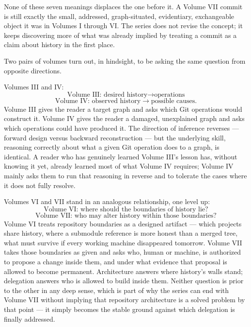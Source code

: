 \documentclass[11pt]{book}
\newcommand{\subheading}[1]{\bigskip\noindent{\bfseries\itshape #1}\smallskip\par}
\begin{document}
None of these seven meanings displaces the one before it. A Volume VII commit is still exactly the small, addressed, graph-situated, evidentiary, exchangeable object it was in Volumes I through VI. The series does not revise the concept; it keeps discovering more of what was already implied by treating a commit as a claim about history in the first place.

\subheading{Two Symmetries}

Two pairs of volumes turn out, in hindsight, to be asking the same question from opposite directions.

Volumes III and IV:
\[
\text{Volume III: desired history} \longrightarrow \text{operations}
\]
\[
\text{Volume IV: observed history} \longrightarrow \text{possible causes}.
\]
Volume III gives the reader a target graph and asks which Git operations would construct it. Volume IV gives the reader a damaged, unexplained graph and asks which operations could have produced it. The direction of inference reverses --- forward design versus backward reconstruction --- but the underlying skill, reasoning correctly about what a given Git operation does to a graph, is identical. A reader who has genuinely learned Volume III's lesson has, without knowing it yet, already learned most of what Volume IV requires; Volume IV mainly asks them to run that reasoning in reverse and to tolerate the cases where it does not fully resolve.

Volumes VI and VII stand in an analogous relationship, one level up:
\[
\text{Volume VI: where should the boundaries of history lie?}
\]
\[
\text{Volume VII: who may alter history within those boundaries?}
\]
Volume VI treats repository boundaries as a designed artifact — which projects share history, where a submodule reference is more honest than a merged tree, what must survive if every working machine disappeared tomorrow. Volume VII takes those boundaries as given and asks who, human or machine, is authorized to propose a change inside them, and under what evidence that proposal is allowed to become permanent. Architecture answers where history's walls stand; delegation answers who is allowed to build inside them. Neither question is prior to the other in any deep sense, which is part of why the series can end with Volume VII without implying that repository architecture is a solved problem by that point --- it simply becomes the stable ground against which delegation is finally addressed.

\subheading{The Ending Was Always True}
\end{document}
